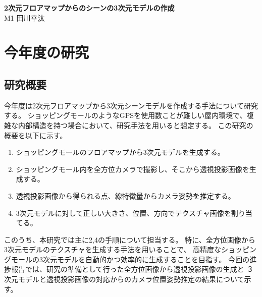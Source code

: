 \documentclass[]{jarticle}          %
\begin{document}

\vspace*{2ex}
\begin{center}
 {\Large \bf 2次元フロアマップからのシーンの3次元モデルの作成}\\ %
 \vspace*{5mm}
 {\large M1 田川幸汰}%
\end{center}





\section{今年度の研究}
\subsection{研究概要}
今年度は2次元フロアマップから3次元シーンモデルを作成する手法について研究する。
ショッピングモールのようなGPSを使用数ことが難しい屋内環境で、複雑な内部構造を持つ場合において、研究手法を用いると想定する。
この研究の概要を以下に示す。
\begin{enumerate}
  \item ショッピングモールのフロアマップから3次元モデルを生成する。
  \item ショッピングモール内を全方位カメラで撮影し、そこから透視投影画像を生成する。
  \item 透視投影画像から得られる点、線特徴量からカメラ姿勢を推定する。
  \item 3次元モデルに対して正しい大きさ、位置、方向でテクスチャ画像を割り当てる。
\end{enumerate}
このうち、本研究では主に2,4の手順について担当する。
特に、全方位画像から3次元モデルのテクスチャを生成する手法を用いることで、
高精度なショッピングモールの3次元モデルを自動的かつ効率的に生成することを目指す。
今回の進捗報告では、研究の準備として行った全方位画像から透視投影画像の生成と
３次元モデルと透視投影画像の対応からのカメラ位置姿勢推定の結果について示す。
\end{document}
